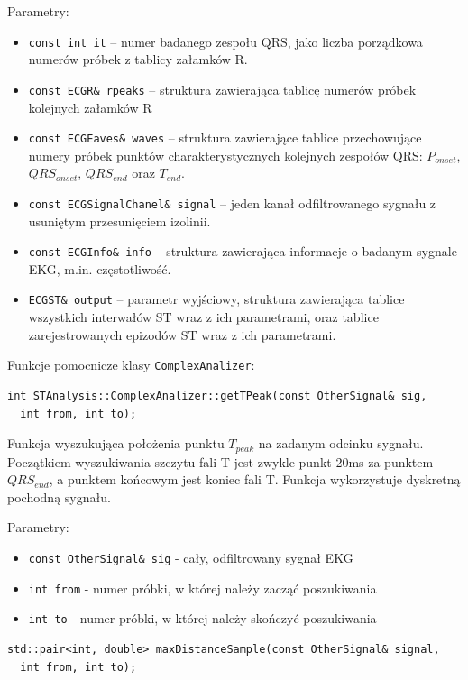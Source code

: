 \documentclass[a4paper, 11pt]{article}
\begin{document}
Parametry:
\begin{itemize}
  \item \verb|const int it| -- numer badanego zespołu QRS, jako liczba
    porządkowa numerów próbek z tablicy załamków R.
  \item \verb|const ECGR& rpeaks| -- struktura zawierająca tablicę numerów
    próbek kolejnych załamków R
  \item \verb|const ECGEaves& waves| -- struktura zawierające tablice
    przechowujące numery próbek punktów charakterystycznych kolejnych zespołów
    QRS: $P_{onset}$, $QRS_{onset}$, $QRS_{end}$ oraz $T_{end}$.
  \item \verb|const ECGSignalChanel& signal| -- jeden kanał odfiltrowanego
    sygnału z usuniętym przesunięciem izolinii.
  \item \verb|const ECGInfo& info| -- struktura zawierająca informacje o badanym
    sygnale EKG, m.in. częstotliwość.
  \item \verb|ECGST& output| -- parametr wyjściowy, struktura zawierająca
    tablice wszystkich interwałów ST wraz z ich parametrami, oraz tablice
    zarejestrowanych epizodów ST wraz z ich parametrami.
\end{itemize}

Funkcje pomocnicze klasy \verb|ComplexAnalizer|:

\begin{lstlisting}
int STAnalysis::ComplexAnalizer::getTPeak(const OtherSignal& sig,
  int from, int to);
\end{lstlisting}

Funkcja wyszukująca położenia punktu $T_{peak}$ na zadanym odcinku sygnału.
Początkiem wyszukiwania szczytu fali T jest zwykle punkt 20ms za punktem
$QRS_{end}$, a punktem końcowym jest koniec fali T. Funkcja wykorzystuje
dyskretną pochodną sygnału.

Parametry:
\begin{itemize}
  \item \verb|const OtherSignal& sig| - cały, odfiltrowany sygnał EKG
  \item \verb|int from| - numer próbki, w której należy zacząć poszukiwania
  \item \verb|int to| - numer próbki, w której należy skończyć poszukiwania
\end{itemize}


\begin{lstlisting}
std::pair<int, double> maxDistanceSample(const OtherSignal& signal, 
  int from, int to);
\end{lstlisting}
\end{document}

